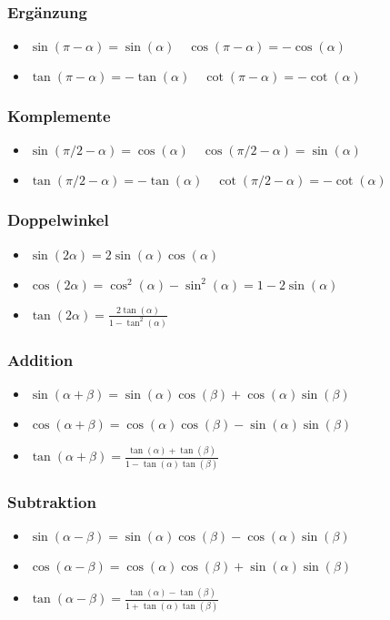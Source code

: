 \documentclass[a4paper,10pt]{article}
\begin{document}
\subsubsection{Ergänzung}
\begin{itemize}
 \item $\sin(\pi - \alpha) = \sin(\alpha) \quad \cos(\pi - \alpha) = - \cos(\alpha)$
 \item $\tan(\pi - \alpha) = -\tan(\alpha) \quad \cot(\pi - \alpha) = - \cot(\alpha)$
\end{itemize}


\subsubsection{Komplemente}
\begin{itemize}
 \item $\sin(\pi/2 - \alpha) = \cos(\alpha) \quad \cos(\pi/2 - \alpha) = \sin(\alpha)$
 \item $\tan(\pi/2 - \alpha) = -\tan(\alpha) \quad \cot(\pi/2 - \alpha) = -\cot(\alpha)$
\end{itemize}

\subsubsection{Doppelwinkel}
\begin{itemize}
 \item $\sin(2\alpha) = 2 \sin(\alpha) \cos(\alpha)$
 \item $\cos(2\alpha) = \cos^2(\alpha) - \sin^2(\alpha) = 1 - 2 \sin(\alpha)$
 \item $\tan(2\alpha) = \frac{2\tan(\alpha)}{1 - \tan^2(\alpha)}$
\end{itemize}

\subsubsection{Addition}
\begin{itemize}
 \item $\sin(\alpha + \beta) = \sin(\alpha) \cos(\beta) + \cos(\alpha) \sin(\beta)$
 \item $\cos(\alpha + \beta) = \cos(\alpha) \cos(\beta) - \sin(\alpha) \sin(\beta)$
 \item $\tan(\alpha + \beta) = \frac{\tan(\alpha) + \tan(\beta)}{1 - \tan(\alpha) \tan(\beta)}$
\end{itemize}

\subsubsection{Subtraktion}
\begin{itemize}
 \item $\sin(\alpha - \beta) = \sin(\alpha) \cos(\beta) - \cos(\alpha)\sin(\beta)$
 \item $\cos(\alpha - \beta) = \cos(\alpha) \cos(\beta) + \sin(\alpha)\sin(\beta)$
 \item $\tan(\alpha - \beta) = \frac{\tan(\alpha) - \tan(\beta)}{1+\tan(\alpha) \tan(\beta)}$
\end{itemize}
\end{document}
